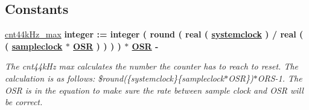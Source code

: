 \subsection*{Constants}
 \begin{DoxyCompactItemize}
\item 
\hypertarget{classclk__divide_1_1clk__div__DAC_a8f64c0dba167ef17ec71f04787ff5a8a}{\hyperlink{classclk__divide_1_1clk__div__DAC_a8f64c0dba167ef17ec71f04787ff5a8a}{cnt44k\-Hz\-\_\-max} {\bfseries \textcolor{comment}{integer}\textcolor{vhdlchar}{ }\textcolor{vhdlchar}{ }\textcolor{vhdlchar}{\-:}\textcolor{vhdlchar}{=}\textcolor{vhdlchar}{ }\textcolor{comment}{integer}\textcolor{vhdlchar}{ }\textcolor{vhdlchar}{(}\textcolor{vhdlchar}{ }\textcolor{vhdlchar}{ }\textcolor{vhdlchar}{round}\textcolor{vhdlchar}{ }\textcolor{vhdlchar}{(}\textcolor{vhdlchar}{ }\textcolor{vhdlchar}{ }\textcolor{comment}{real}\textcolor{vhdlchar}{ }\textcolor{vhdlchar}{(}\textcolor{vhdlchar}{ }\textcolor{vhdlchar}{ }{\bfseries \hyperlink{classclk__divide_a81d31886de4b5afc05873543265dcf7c}{systemclock}} \textcolor{vhdlchar}{ }\textcolor{vhdlchar}{)}\textcolor{vhdlchar}{ }\textcolor{vhdlchar}{ }\textcolor{vhdlchar}{/}\textcolor{vhdlchar}{ }\textcolor{comment}{real}\textcolor{vhdlchar}{ }\textcolor{vhdlchar}{(}\textcolor{vhdlchar}{ }\textcolor{vhdlchar}{ }\textcolor{vhdlchar}{(}\textcolor{vhdlchar}{ }{\bfseries \hyperlink{classclk__divide_a046b87df8ce0a99f5bacf19e5027cccf}{sampleclock}} \textcolor{vhdlchar}{ }\textcolor{vhdlchar}{$\ast$}\textcolor{vhdlchar}{ }{\bfseries \hyperlink{classclk__divide_aeab4f828c7bc0927792f6a9c6bf1b63f}{O\-S\-R}} \textcolor{vhdlchar}{ }\textcolor{vhdlchar}{)}\textcolor{vhdlchar}{ }\textcolor{vhdlchar}{ }\textcolor{vhdlchar}{)}\textcolor{vhdlchar}{ }\textcolor{vhdlchar}{ }\textcolor{vhdlchar}{)}\textcolor{vhdlchar}{ }\textcolor{vhdlchar}{ }\textcolor{vhdlchar}{)}\textcolor{vhdlchar}{ }\textcolor{vhdlchar}{ }\textcolor{vhdlchar}{$\ast$}\textcolor{vhdlchar}{ }{\bfseries \hyperlink{classclk__divide_aeab4f828c7bc0927792f6a9c6bf1b63f}{O\-S\-R}} \textcolor{vhdlchar}{ }\textcolor{vhdlchar}{-\/}\textcolor{vhdlchar}{ }} }\label{classclk__divide_1_1clk__div__DAC_a8f64c0dba167ef17ec71f04787ff5a8a}

\begin{DoxyCompactList}\small\item\em The cnt44k\-Hz max calculates the number the counter has to reach to reset. The calculation is as follows\-: \$round(\{systemclock\}\{sampleclock$\ast$\-O\-S\-R\})$\ast$\-O\-R\-S-\/1. The O\-S\-R is in the equation to make sure the rate between sample clock and O\-S\-R will be correct. \end{DoxyCompactList}\end{DoxyCompactItemize}
